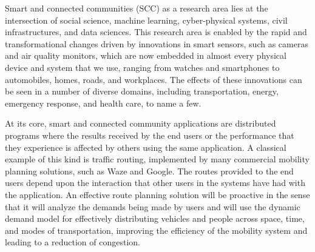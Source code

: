 

%

%
Smart and connected communities (SCC) as a research area lies at the intersection of social science, machine learning, cyber-physical systems, civil infrastructures, and data sciences. This research area is  enabled by the rapid and transformational changes driven by  innovations in smart sensors, such as cameras and air quality monitors, which are now  embedded in almost every physical device and system that we use, ranging from watches and smartphones to automobiles, homes, roads, and workplaces. 
The effects of these innovations can be seen in a number of diverse domains, including transportation, energy, emergency response, and  health care, to name a few.


\ifExtended
At its core, smart and connected community applications are distributed programs where the results received by the end users or the performance that they experience is affected by others using the same application. A classical example of this kind is traffic routing,  implemented by many commercial mobility planning solutions, such as Waze and Google. The routes provided to the end users depend upon the interaction that other users in the systems have had with the application. An effective route planning solution will be proactive in the sense that it will analyze the demands being made by users and will use the dynamic demand model for effectively distributing vehicles and people across space, time, and modes of transportation, improving the efficiency of the mobility system and leading to a reduction of congestion.
\fi


